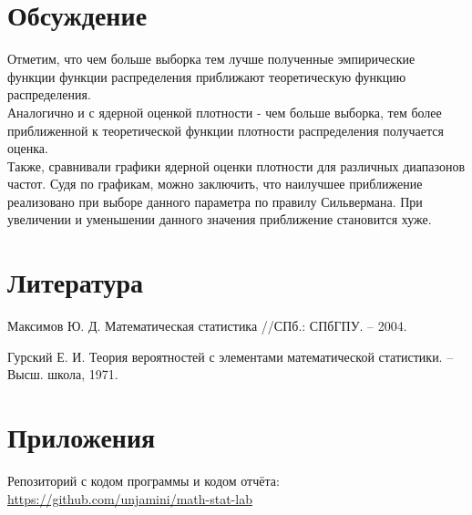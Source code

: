 \section{Обсуждение}
Отметим, что чем больше выборка тем лучше полученные эмпирические функции функции распределения приближают теоретическую функцию распределения.
\\
Аналогично и с ядерной оценкой плотности - чем больше выборка, тем более приближенной к теоретической функции плотности распределения получается оценка.
\\
Также, сравнивали графики ядерной оценки плотности для различных диапазонов частот. Судя по графикам, можно заключить, что наилучшее приближение реализовано при выборе данного параметра по правилу Сильвермана. При увеличении и уменьшении данного значения приближение становится хуже. 


\section{Литература}
Максимов Ю. Д. Математическая статистика //СПб.: СПбГПУ. – 2004.

Гурский Е. И. Теория вероятностей с элементами математической статистики. – Высш. школа, 1971.

\section{Приложения}

Репозиторий с кодом программы и кодом отчёта: \href{https://github.com/unjamini/math-stat-lab}{https://github.com/unjamini/math-stat-lab}




